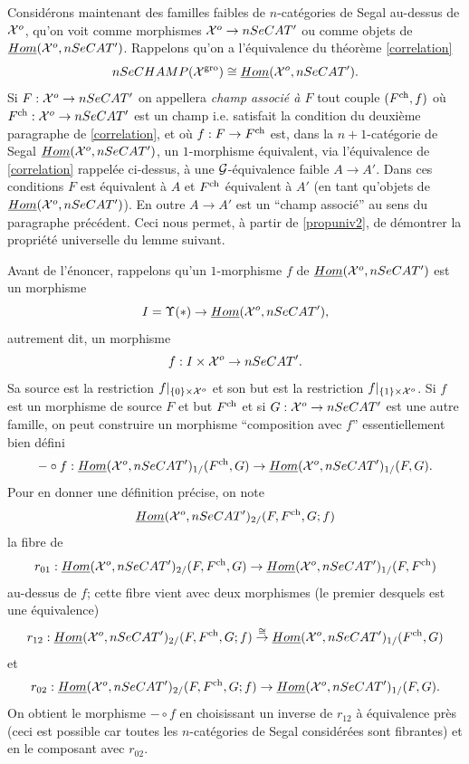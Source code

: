 \documentclass[12pt]{article}
\newcommand{\Gg}{{\cal G}}
\newcommand{\Xx}{{\cal X}}
\begin{document}
Consid\'erons maintenant des
familles faibles de $n$-cat\'egories de Segal au-dessus de $\Xx ^o$,
qu'on voit comme morphismes
$\Xx ^o\rightarrow nSeCAT'$ ou comme objets de
$\underline{Hom}(\Xx ^o, nSeCAT')$.
Rappelons qu'on a l'\'equivalence
du th\'eor\`eme \ref{correlation}
$$
nSeCHAMP(\Xx ^{\rm gro}) \cong \underline{Hom}(\Xx ^o, nSeCAT').
$$
Si $F:\Xx ^o\rightarrow nSeCAT'$ on appellera {\em champ associ\'e \`a
$F$} tout couple $(F^{\rm ch}, f)$ o\`u
$F^{\rm ch}:\Xx ^o\rightarrow nSeCAT'$ est un champ i.e. satisfait la condition
du deuxi\`eme paragraphe de \ref{correlation}, et o\`u
$f: F \rightarrow F^{\rm ch}$ est, dans la $n+1$-cat\'egorie de Segal
$\underline{Hom}(\Xx ^o, nSeCAT')$, un
$1$-morphisme
\'equivalent, via l'\'equivalence de \ref{correlation} rappel\'ee
ci-dessus, \`a une $\Gg$-\'equivalence faible $A\rightarrow A'$.
Dans ces conditions $F$ est \'equivalent \`a $A$ et $F^{\rm ch}$ \'equivalent
\`a $A'$ (en tant qu'objets de $\underline{Hom}(\Xx ^o, nSeCAT')$).
En outre $A\rightarrow A'$ est un ``champ associ\'e'' au sens du
paragraphe pr\'ec\'edent. Ceci nous
permet, \`a partir de \ref{propuniv2}, de d\'emontrer la
propri\'et\'e universelle du lemme suivant.

Avant de l'\'enoncer, rappelons qu'un $1$-morphisme $f$ de
$\underline{Hom}(\Xx ^o, nSeCAT')$ est un morphisme
$$
I=\Upsilon (\ast )\rightarrow \underline{Hom}(\Xx ^o, nSeCAT'),
$$
autrement dit, un morphisme
$$
f:I\times \Xx ^o\rightarrow nSeCAT'.
$$
Sa source est la restriction $f|_{\{ 0\} \times \Xx ^o}$ et son but
est la restriction $f|_{\{ 1\} \times \Xx ^o}$. Si $f$ est un morphisme de
source $F$ et but $F^{\rm ch}$ et si $G:\Xx ^o\rightarrow nSeCAT'$ est une
autre famille, on peut construire
un morphisme ``composition avec $f$'' essentiellement
bien d\'efini
$$
-\circ f : \underline{Hom}(\Xx ^o, nSeCAT')_{1/}(F^{\rm ch}, G)
\rightarrow \underline{Hom}(\Xx ^o, nSeCAT')_{1/}(F, G).
$$
Pour en donner une d\'efinition pr\'ecise, on note
$$
\underline{Hom}(\Xx ^o, nSeCAT')_{2/}(F,F^{\rm ch}, G;f)
$$
la fibre de
$$
r_{01}:\underline{Hom}(\Xx ^o, nSeCAT')_{2/}(F,F^{\rm ch}, G)
\rightarrow \underline{Hom}(\Xx ^o, nSeCAT')_{1/}(F,F^{\rm ch})
$$
au-dessus de $f$; cette fibre vient avec deux morphismes
(le premier desquels est une \'equivalence)
$$
r_{12}:\underline{Hom}(\Xx ^o, nSeCAT')_{2/}(F,F^{\rm ch}, G;f)
\stackrel{\cong}{\rightarrow}
\underline{Hom}(\Xx ^o, nSeCAT')_{1/}(F^{\rm ch}, G)
$$
et
$$
r_{02}:\underline{Hom}(\Xx ^o, nSeCAT')_{2/}(F,F^{\rm ch}, G;f)
\rightarrow
\underline{Hom}(\Xx ^o, nSeCAT')_{1/}(F, G).
$$
On obtient le morphisme $-\circ f$ en choisissant un inverse de $r_{12}$
\`a \'equivalence pr\`es (ceci est possible car toutes les $n$-cat\'egories de
Segal consid\'er\'ees sont fibrantes) et en le composant avec $r_{02}$.
\end{document}
